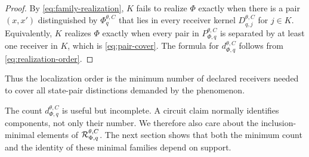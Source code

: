 \begin{proof}
By \eqref{eq:family-realization}, $K$ fails to realize $\Phi$ exactly when there is a pair $(x,x')$ distinguished by $\Phi_q^{\theta,C}$ that lies in every receiver kernel $D_{q,j}^{\theta,C}$ for $j\in K$. Equivalently, $K$ realizes $\Phi$ exactly when every pair in $P_{\Phi,q}^{\theta,C}$ is separated by at least one receiver in $K$, which is \eqref{eq:pair-cover}. The formula for $d_{\Phi,q}^{\theta,C}$ follows from \eqref{eq:realization-order}.
\end{proof}

Thus the localization order is the minimum number of declared receivers needed to cover all state-pair distinctions demanded by the phenomenon.

The count $d_{\Phi,q}^{\theta,C}$ is useful but incomplete. A circuit claim normally identifies components, not only their number. We therefore also care about the inclusion-minimal elements of $\mathcal{R}_{\Phi,q}^{\theta,C}$. The next section shows that both the minimum count and the identity of these minimal families depend on support.

